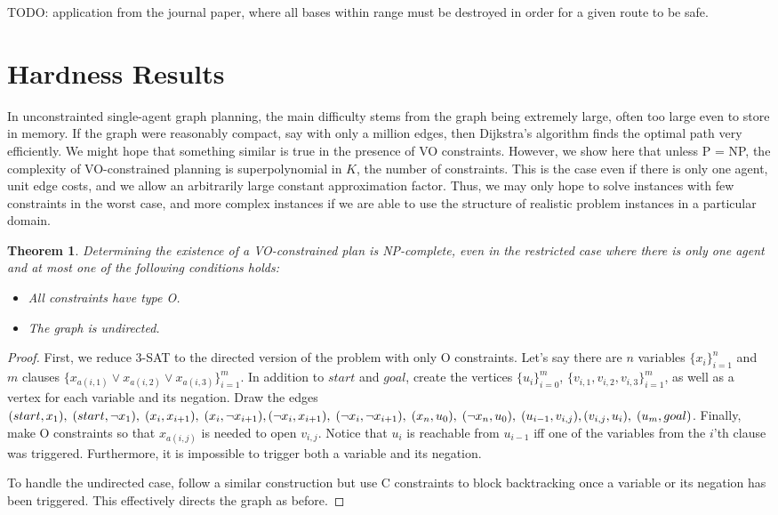 \documentclass[letterpaper]{article}
\newtheorem{thm}{Theorem}
\begin{document}
TODO: application from the journal paper, where all bases within range must be destroyed in order for a given route to be safe.


\section{Hardness Results}

In unconstrainted single-agent graph planning, the main difficulty stems from the graph being extremely large, often too large even to store in memory. If the graph were reasonably compact, say with only a million edges, then Dijkstra's algorithm finds the optimal path very efficiently. We might hope that something similar is true in the presence of VO constraints. However, we show here that unless P = NP, the complexity of VO-constrained planning is superpolynomial in $K$, the number of constraints. This is the case even if there is only one agent, unit edge costs, and we allow an arbitrarily large constant approximation factor. Thus, we may only hope to solve instances with few constraints in the worst case, and more complex instances if we are able to use the structure of realistic problem instances in a particular domain.

\begin{thm}
\label{NP1}
Determining the existence of a VO-constrained plan is NP-complete, even in the restricted case where there is only one agent and at most one of the following conditions holds:
\begin{itemize}
\item All constraints have type O.
\item The graph is undirected.
\end{itemize}
\end{thm}

\begin{proof}
First, we reduce 3-SAT to the directed version of the problem with only O constraints. Let's say there are $n$ variables $\{x_i\}_{i=1}^n$ and $m$ clauses $\{x_{a(i,1)} \vee x_{a(i,2)} \vee x_{a(i,3)} \}_{i=1}^m$. In addition to $start$ and $goal$, create the vertices $\{u_i\}_{i=0}^m$, $\{v_{i,1},v_{i,2},v_{i,3}\}_{i=1}^m$, as well as a vertex for each variable and its negation. Draw the edges
$(start,x_1),\;(start,\neg x_1),\;(x_i,x_{i+1}),\;(x_i,\neg x_{i+1}),\;
\\(\neg x_i,x_{i+1}),\;(\neg x_i,\neg x_{i+1}),\;(x_n,u_0),\;(\neg x_n,u_0),\;(u_{i-1},v_{i,j}),\;
\\(v_{i,j},u_i),\;(u_m,goal)$.
Finally, make O constraints so that $x_{a(i,j)}$ is needed to open $v_{i,j}$. Notice that $u_i$ is reachable from $u_{i-1}$ iff one of the variables from the $i$'th clause was triggered. Furthermore, it is impossible to trigger both a variable and its negation.

To handle the undirected case, follow a similar construction but use C constraints to block backtracking once a variable or its negation has been triggered. This effectively directs the graph as before.
\end{proof}
\end{document}
